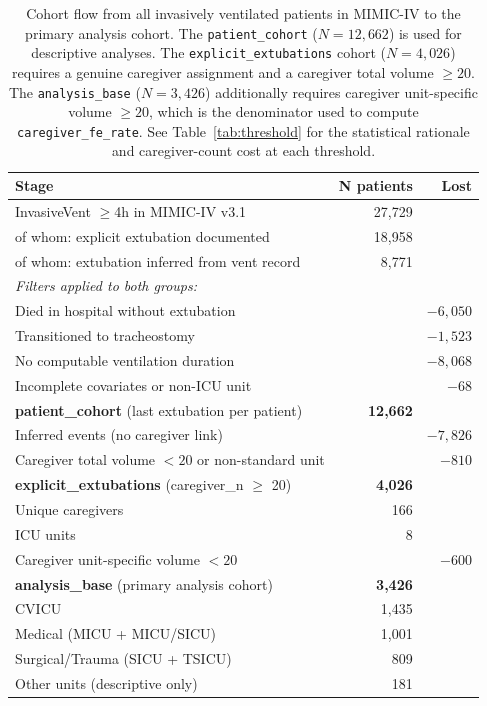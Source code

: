 \documentclass[11pt]{article}
\begin{document}
\begin{table}[h!]
\centering
\begin{tabular}{lrr}
\toprule
Stage & N patients & Lost \\
\midrule
InvasiveVent $\geq$4h in MIMIC-IV v3.1 & 27,729 & \\
\quad of whom: explicit extubation documented & 18,958 & \\
\quad of whom: extubation inferred from vent record & 8,771 & \\
\addlinespace
\textit{Filters applied to both groups:} & & \\
\quad Died in hospital without extubation & & $-6{,}050$ \\
\quad Transitioned to tracheostomy & & $-1{,}523$ \\
\quad No computable ventilation duration & & $-8{,}068$ \\
\quad Incomplete covariates or non-ICU unit & & $-68$ \\
\midrule
\textbf{patient\_cohort} (last extubation per patient) & \textbf{12,662} & \\
\addlinespace
\quad Inferred events (no caregiver link) & & $-7{,}826$ \\
\quad Caregiver total volume $< 20$ or non-standard unit & & $-810$ \\
\midrule
\textbf{explicit\_extubations} (caregiver\_n $\geq$ 20) & \textbf{4,026} & \\
\quad Unique caregivers & 166 & \\
\quad ICU units & 8 & \\
\addlinespace
\quad Caregiver unit-specific volume $< 20$ & & $-600$ \\
\midrule
\textbf{analysis\_base} (primary analysis cohort) & \textbf{3,426} & \\
\quad CVICU & 1,435 & \\
\quad Medical (MICU + MICU/SICU) & 1,001 & \\
\quad Surgical/Trauma (SICU + TSICU) & 809 & \\
\quad Other units (descriptive only) & 181 & \\
\bottomrule
\end{tabular}
\caption{Cohort flow from all invasively ventilated patients in MIMIC-IV to the primary analysis cohort. The \texttt{patient\_cohort} ($N=12{,}662$) is used for descriptive analyses. The \texttt{explicit\_extubations} cohort ($N=4{,}026$) requires a genuine caregiver assignment and a caregiver total volume $\geq 20$. The \texttt{analysis\_base} ($N=3{,}426$) additionally requires caregiver unit-specific volume $\geq 20$, which is the denominator used to compute \texttt{caregiver\_fe\_rate}. See Table~\ref{tab:threshold} for the statistical rationale and
caregiver-count cost at each threshold.}
\label{tab:cohort_flow}
\end{table}
\end{document}
